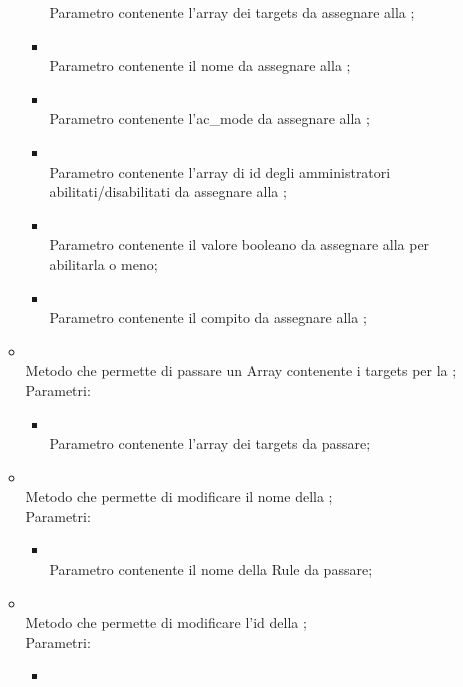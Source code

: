 \begin{itemize}
\begin{itemize}
\begin{itemize}
			Parametro contenente l'array dei targets da assegnare alla ;
			\item {} \\
			Parametro contenente il nome da assegnare alla ;
			\item {} \\
			Parametro contenente l'ac\_mode da assegnare alla ;
			\item {} \\
			Parametro contenente l'array di id degli amministratori abilitati/disabilitati da assegnare alla ;
			\item {} \\
			Parametro contenente il valore booleano da assegnare alla  per abilitarla o meno;
			\item {} \\
			Parametro contenente il compito da assegnare alla ;
		\end{itemize}
		\item[]  \\		Metodo che permette di passare un Array contenente i targets per la ;\\
		Parametri:
		\begin{itemize}
			\item {} \\
			Parametro contenente l'array dei targets da passare;
		\end{itemize}
		\item[]  \\		Metodo che permette di modificare il nome della ;\\
		Parametri:
		\begin{itemize}
			\item {} \\
			Parametro contenente il nome della Rule da passare;
		\end{itemize}
		\item[]  \\		Metodo che permette di modificare l'id della ;\\
		Parametri:
		\begin{itemize}
			\item {} \\

\end{itemize}
\end{itemize}
\end{itemize}
